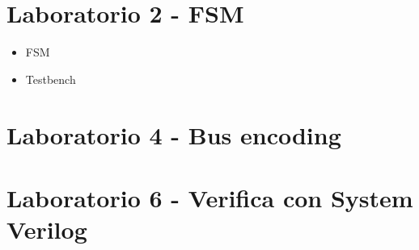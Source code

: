 \documentclass[11pt,  english, makeidx, a4paper, titlepage, oneside]{book}
\newenvironment{listato}{\footnotesize} {\normalsize }
\begin{document}
\section{Laboratorio 2 - FSM}
\begin{itemize}
\item FSM
\begin{center}
\begin{listato}
	\centerline{}
\end{listato}
\end{center}
\newpage
\begin{center}
\begin{listato}
	\centerline{}
\end{listato}
\end{center}
\newpage
\item Testbench
\begin{center}
\begin{listato}
	\centerline{}
\end{listato}
\end{center}
\end{itemize}
\newpage
\section{Laboratorio 4 - Bus encoding}
\begin{center}
\begin{listato}
	\centerline{}
\end{listato}
\end{center}
\newpage
\section{Laboratorio 6 - Verifica con System Verilog}
\begin{center}
\begin{listato}
	\centerline{}
\end{listato}
\end{center}
\end{document}

